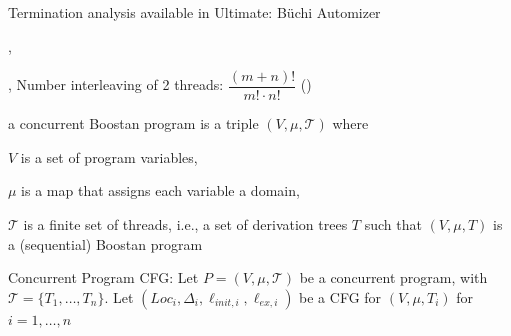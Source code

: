\documentclass[landscape, a4paper]{article}
\begin{document}
\begin{minipage}[t]{0.2\linewidth}
\begin{betterlist}
\begin{betterlist}
			\item Termination analysis available in Ultimate: \alert{Büchi Automizer}
		\end{betterlist}
		\item {}, 
	\end{betterlist}
\end{minipage}
\begin{minipage}[t]{0.2\linewidth}
	\begin{betterlist}
		\item {}, Number interleaving of 2 threads: $\dfrac{(m+n)!}{m!\cdot n!} $ ()
		\item \color{orange}a \alert{ concurrent Boostan program}  is a triple $(V , \mu , \mathcal{T})$ where
		\begin{betterlist}
			\item $V$ is a set of program variables,
			\item $\mu$ is a map that assigns each variable a domain,
			\item $\mathcal{T}$ is a finite set of threads, i.e., a set of derivation trees $T$ such that $(V , \mu , T)$ is a (sequential) Boostan program
		\end{betterlist}\color{black}
		\item \color{orange}\alert{Concurrent Program CFG:} Let $P = (V , \mu , \mathcal{T} )$ be a concurrent program, with $\mathcal{T} = \{ T_1,\ldots, T_n\}$. Let $(Loc_i, \Delta_i, \ell_{init,i}, \ell_{ex,i})$ be a CFG for $(V, \mu , T_i)$ for $i = 1, \ldots, n$


\end{betterlist}
\end{minipage}
\end{document}
